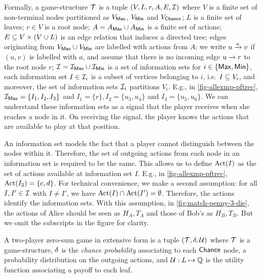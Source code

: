 Formally, a game-structure $\mathcal{T}$ is a tuple $(V, L, r, A, E, \mathcal{I})$
where $V$ is a finite set of non-terminal nodes partitioned as
$V_{\mathsf{Max}}$, $V_{\mathsf{Min}}$ and $V_{\mathsf{Chance}}$; $L$ is a finite set of leaves;
$r \in V$ is a root node; $A = A_{\mathsf{Max}} \cup A_{\mathsf{Min}}$ is a finite set
of actions; $E \subseteq V \times (V \cup L)$ is an edge
relation that induces a directed tree; edges originating from $V_{\mathsf{Max}} \cup V_{\mathsf{Min}}$ are labelled with actions from $A$; we write $u \xrightarrow{a} v$ if
$(u, v)$ is labelled with $a$, and assume that there is no incoming edge
$u \xrightarrow{} r$ to the root node $r$; $\mathcal{I} = \mathcal{I}_{\mathsf{Max}} \cup \mathcal{I}_{\mathsf{Min}}$
is a set of information sets for $i \in \{ \mathsf{Max}, \mathsf{Min} \}$, each
information set $I \in \mathcal{I}_i$ is a subset of vertices belonging to
$i$, i.e. $I \subseteq V_i$, and moreover, the set of information sets
$\mathcal{I}_i$ partitions $V_i$. E.g., in \cref{fig-allexmp-pftrec},
$\mathcal{I}_{\mathsf{Max}} = \{I_1, I_2, I_3\}$ and $I_1 = \{r\}, I_2 = \{u_3, u_4\}$
and $I_3 = \{u_5, u_6\}$. We can understand these information sets as a signal that the player receives when she reaches a node in it. On receiving the signal, the player knows the actions that are available to play at that position. 

An information set models the fact that a player cannot distinguish
between the nodes within it. Therefore, the set of outgoing actions
from each node in an information set is required to be the same. This
allows us to define $\operatorname{Act}(I)$ as the set of actions available at
information set $I$. E.g., in \cref{fig-allexmp-pftrec},
$\operatorname{Act}(I_2) = \{c, d\}$. For technical convenience, we make a second
assumption: for all $I, I' \in \mathcal{I}$ with $I \neq I'$, we have
$\operatorname{Act}(I) \cap \operatorname{Act}(I') = \emptyset$. Therefore, the actions identify
the information sets. With this assumption, in \cref{fig:match-penny-3-die}, the actions of Alice should be seen as $H_A, T_A$ and those of Bob's as $H_B, T_B$. But we omit the subscripts in the figure for clarity. 
\begin{definition}\label{def:ext-form-games}
  A two-player zero-sum game in extensive form is a tuple
  $(\mathcal{T},\delta, \mathcal{U})$ where $\mathcal{T}$ is a game-structure, $\delta$ is the
  \emph{chance probability} associating to each $\mathsf{Chance}$ node, a
  probability distribution on the outgoing actions, and
  $\mathcal{U} : L \mapsto \mathbb{Q} $ is the utility function associating a payoff
  to each leaf.
\end{definition}

